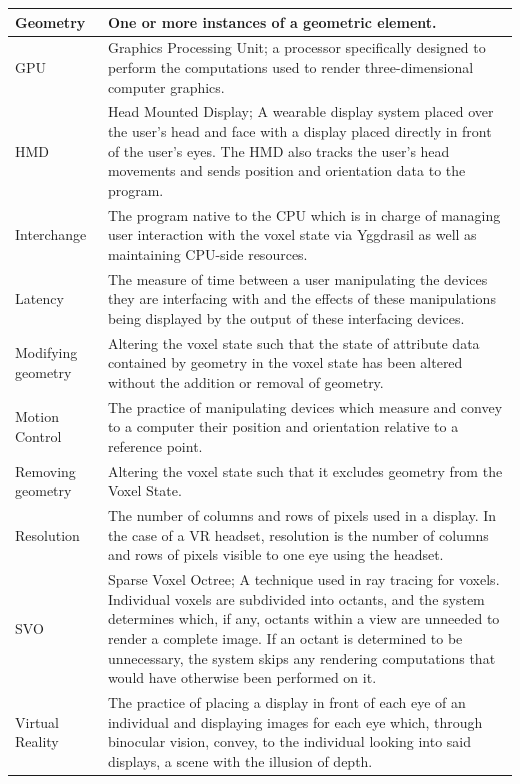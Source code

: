 \documentclass[onecolumn, draftclsnofoot,10pt, compsoc]{IEEEtran}
\begin{document}
\begin{longtable}{ | l | p{12cm} | }
Geometry & One or more instances of a geometric element.  \\ \hline
GPU & Graphics Processing Unit; a processor specifically designed to perform the computations used to render three-dimensional computer graphics.  \\ \hline
HMD & Head Mounted Display; A wearable display system placed over the user’s head and face with a display placed directly in front of the user’s eyes. The HMD also tracks the user’s head movements and sends position and orientation data to the program.  \\ \hline
Interchange & The program native to the CPU which is in charge of managing user interaction with the voxel state via Yggdrasil as well as maintaining CPU-side resources. \\ \hline
Latency & The measure of time between a user manipulating the devices they are interfacing with and the effects of these manipulations being displayed by the output of these interfacing devices. \\ \hline
Modifying geometry & Altering the voxel state such that the state of attribute data contained by geometry in the voxel state has been altered without the addition or removal of geometry.  \\ \hline
Motion Control & The practice of manipulating devices which measure and convey to a computer their position and orientation relative to a reference point.  \\ \hline
Removing geometry & Altering the voxel state such that it excludes geometry from the Voxel State.  \\ \hline
Resolution & The number of columns and rows of pixels used in a display. In the case of  a VR headset, resolution is the number of columns and rows of pixels visible to one eye using the headset. \\ \hline
SVO & Sparse Voxel Octree; A technique used in ray tracing for voxels. Individual voxels are subdivided into octants, and the system determines which, if any, octants within a view are unneeded to render a complete image. If an octant is determined to be unnecessary, the system skips any rendering computations that would have otherwise been performed on it.\\ \hline
Virtual Reality & The practice of placing a display in front of each eye of an individual and displaying images for each eye which, through binocular vision, convey, to the individual looking into said displays, a scene with the illusion of depth.  \\ \hline

\end{longtable}
\end{document}
